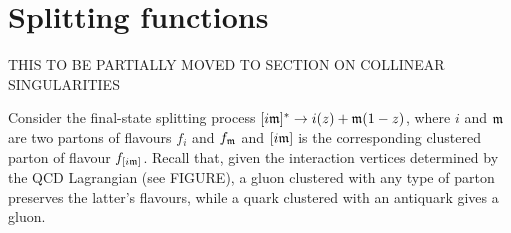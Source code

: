 \section{Splitting functions}
\label{sec:spl-func}

THIS TO BE PARTIALLY MOVED TO SECTION ON COLLINEAR SINGULARITIES

Consider the final-state splitting process $ [i\mathfrak{m}]^* \rightarrow i(z) + \mathfrak{m}(1-z) $, where $ i $ and $ \mathfrak{m} $ are two partons of flavours $ f_i $ and $ f_{\mathfrak{m}} $ and $ [i\mathfrak{m}] $ is the corresponding clustered parton of flavour $ f_{[i\mathfrak{m}]} $. Recall that, given the interaction vertices determined by the QCD Lagrangian  (see FIGURE), a gluon clustered with any type of parton preserves the latter's flavours, while a quark clustered with an antiquark gives a gluon.

